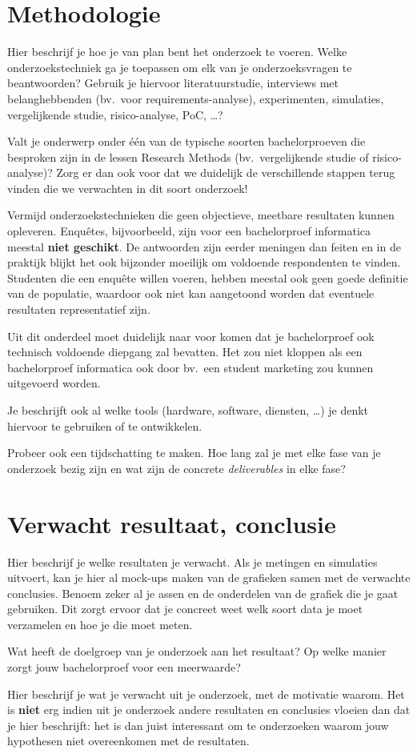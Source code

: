 \section{Methodologie}%
\label{sec:methodologie}

Hier beschrijf je hoe je van plan bent het onderzoek te voeren. Welke onderzoekstechniek ga je toepassen om elk van je onderzoeksvragen te beantwoorden? Gebruik je hiervoor literatuurstudie, interviews met belanghebbenden (bv.~voor requirements-analyse), experimenten, simulaties, vergelijkende studie, risico-analyse, PoC, \ldots?

Valt je onderwerp onder één van de typische soorten bachelorproeven die besproken zijn in de lessen Research Methods (bv.\ vergelijkende studie of risico-analyse)? Zorg er dan ook voor dat we duidelijk de verschillende stappen terug vinden die we verwachten in dit soort onderzoek!

Vermijd onderzoekstechnieken die geen objectieve, meetbare resultaten kunnen opleveren. Enquêtes, bijvoorbeeld, zijn voor een bachelorproef informatica meestal \textbf{niet geschikt}. De antwoorden zijn eerder meningen dan feiten en in de praktijk blijkt het ook bijzonder moeilijk om voldoende respondenten te vinden. Studenten die een enquête willen voeren, hebben meestal ook geen goede definitie van de populatie, waardoor ook niet kan aangetoond worden dat eventuele resultaten representatief zijn.

Uit dit onderdeel moet duidelijk naar voor komen dat je bachelorproef ook technisch voldoen\-de diepgang zal bevatten. Het zou niet kloppen als een bachelorproef informatica ook door bv.\ een student marketing zou kunnen uitgevoerd worden.

Je beschrijft ook al welke tools (hardware, software, diensten, \ldots) je denkt hiervoor te gebruiken of te ontwikkelen.

Probeer ook een tijdschatting te maken. Hoe lang zal je met elke fase van je onderzoek bezig zijn en wat zijn de concrete \emph{deliverables} in elke fase?

\section{Verwacht resultaat, conclusie}%
\label{sec:verwachte_resultaten}

Hier beschrijf je welke resultaten je verwacht. Als je metingen en simulaties uitvoert, kan je hier al mock-ups maken van de grafieken samen met de verwachte conclusies. Benoem zeker al je assen en de onderdelen van de grafiek die je gaat gebruiken. Dit zorgt ervoor dat je concreet weet welk soort data je moet verzamelen en hoe je die moet meten.

Wat heeft de doelgroep van je onderzoek aan het resultaat? Op welke manier zorgt jouw bachelorproef voor een meerwaarde?

Hier beschrijf je wat je verwacht uit je onderzoek, met de motivatie waarom. Het is \textbf{niet} erg indien uit je onderzoek andere resultaten en conclusies vloeien dan dat je hier beschrijft: het is dan juist interessant om te onderzoeken waarom jouw hypothesen niet overeenkomen met de resultaten.


